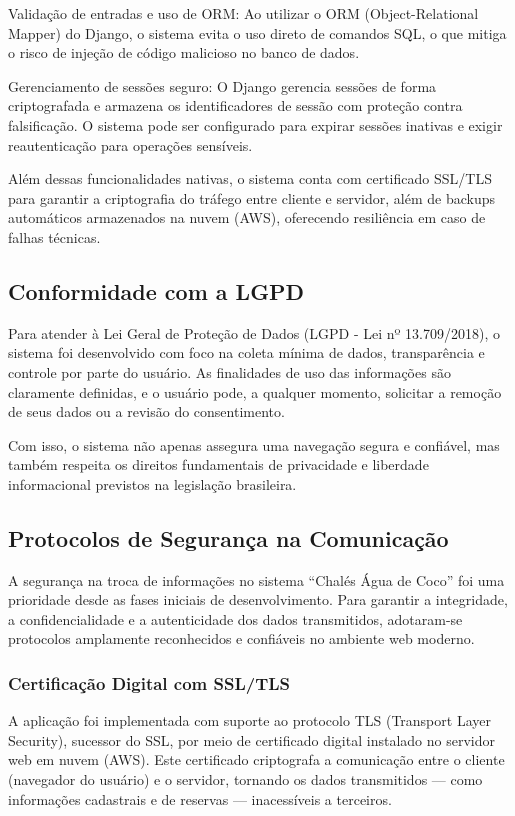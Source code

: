 \documentclass[
	12pt,				%
	openany,			%
	twoside,			%
	a4paper,			%
	english,			%
	french,				%
	spanish,			%
	brazil				%
	]{abntex2}
\begin{document}
Validação de entradas e uso de ORM: Ao utilizar o ORM (Object-Relational Mapper) do Django, o sistema evita o uso direto de comandos SQL, o que mitiga o risco de injeção de código malicioso no banco de dados.

Gerenciamento de sessões seguro: O Django gerencia sessões de forma criptografada e armazena os identificadores de sessão com proteção contra falsificação. O sistema pode ser configurado para expirar sessões inativas e exigir reautenticação para operações sensíveis.

Além dessas funcionalidades nativas, o sistema conta com certificado SSL/TLS para garantir a criptografia do tráfego entre cliente e servidor, além de backups automáticos armazenados na nuvem (AWS), oferecendo resiliência em caso de falhas técnicas.

\subsection{Conformidade com a LGPD}
Para atender à Lei Geral de Proteção de Dados (LGPD - Lei nº 13.709/2018), o sistema foi desenvolvido com foco na coleta mínima de dados, transparência e controle por parte do usuário. As finalidades de uso das informações são claramente definidas, e o usuário pode, a qualquer momento, solicitar a remoção de seus dados ou a revisão do consentimento.

Com isso, o sistema não apenas assegura uma navegação segura e confiável, mas também respeita os direitos fundamentais de privacidade e liberdade informacional previstos na legislação brasileira.

\subsection{Protocolos de Segurança na Comunicação}
A segurança na troca de informações no sistema “Chalés Água de Coco” foi uma prioridade desde as fases iniciais de desenvolvimento. Para garantir a integridade, a confidencialidade e a autenticidade dos dados transmitidos, adotaram-se protocolos amplamente reconhecidos e confiáveis no ambiente web moderno.

\subsubsection{Certificação Digital com SSL/TLS}
A aplicação foi implementada com suporte ao protocolo TLS (Transport Layer Security), sucessor do SSL, por meio de certificado digital instalado no servidor web em nuvem (AWS). Este certificado criptografa a comunicação entre o cliente (navegador do usuário) e o servidor, tornando os dados transmitidos — como informações cadastrais e de reservas — inacessíveis a terceiros.
\end{document}
